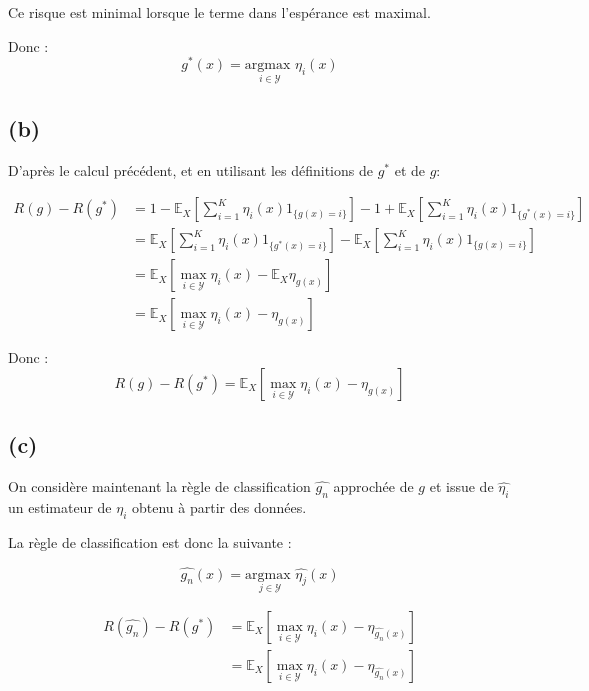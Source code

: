 \documentclass[
]{article}
\begin{document}
Ce risque est minimal lorsque le terme dans l'espérance est maximal.

Donc : \[
\boxed{g^*(x) = \underset{i \in \mathcal{Y}}{\text{argmax }} \eta_i(x)}
\]

\hypertarget{b-1}{%
\subsection{(b)}\label{b-1}}

D'après le calcul précédent, et en utilisant les définitions de \(g^*\)
et de \(g\):

\begin{align*}
  R(g) - R(g^*)   &= 1 - \mathbb{E}_X \left[\sum_{i=1}^K \eta_i(x) {1}_{\{g(x) = i\}}\right] - 1 + \mathbb{E}_X \left[\sum_{i=1}^K \eta_i(x) {1}_{\{g^*(x) = i\}}\right]\\
                  &= \mathbb{E}_X \left[\sum_{i=1}^K \eta_i(x) {1}_{\{g^*(x) = i\}}\right] - \mathbb{E}_X \left[\sum_{i=1}^K \eta_i(x) {1}_{\{g(x) = i\}}\right]\\
                  &= \mathbb{E}_X \left[\underset{i\in \mathcal{Y}}{\max}\eta_i(x) - \mathbb{E}_X \eta_{g(x)} \right]\\
                  &= \mathbb{E}_X \left[\underset{i\in \mathcal{Y}}{\max}\eta_i(x) - \eta_{g(x)} \right]
\end{align*}

Donc : \[
\boxed{R(g) - R(g^*) = \mathbb{E}_X \left[\underset{i\in \mathcal{Y}}{\max}\eta_i(x) - \eta_{g(x)} \right]}
\]

\hypertarget{c}{%
\subsection{(c)}\label{c}}

On considère maintenant la règle de classification \(\hat{g_n}\)
approchée de \(g\) et issue de \(\hat{\eta_i}\) un estimateur de
\(\eta_i\) obtenu à partir des données.

La règle de classification est donc la suivante :

\[
\hat{g_n}(x) = \underset{j \in \mathcal{Y}}{\text{argmax }} \hat{\eta_j}(x)
\]

\begin{align*}
R(\hat{g_n}) - R(g^*)     &= \mathbb{E}_X \left[ \underset{i\in \mathcal{Y}}{\max} \eta_i(x) - \eta_{\hat{g_n}(x)} \right]\\
                          &= \mathbb{E}_X\left[ \underset{i\in \mathcal{Y}}{\max}\eta_i(x) - \eta_{\hat{g_n}(x)} \right]
\end{align*}
\end{document}
